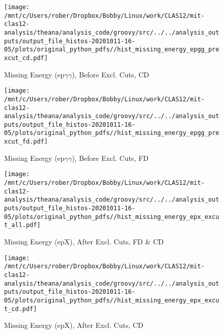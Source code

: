 \documentclass{article}
\begin{document}
\begin{landscape}
    \begin{figure}[h]
        \centering

        \texttt{[image: /mnt/c/Users/rober/Dropbox/Bobby/Linux/work/CLAS12/mit-clas12-analysis/theana/analysis\_code/groovy/src/../../analysis\_outputs/output\_file\_histos-20201011-16-05/plots/original\_python\_pdfs//hist\_missing\_energy\_epgg\_prexcut\_cd.pdf]}
        \captionsetup{textformat=empty,labelformat=blank}
        \caption{Missing Energy (ep$\gamma$$\gamma$), Before Excl. Cuts, CD}
    \end{figure}
    \clearpage
    
    \begin{figure}[h]
        \centering

        \texttt{[image: /mnt/c/Users/rober/Dropbox/Bobby/Linux/work/CLAS12/mit-clas12-analysis/theana/analysis\_code/groovy/src/../../analysis\_outputs/output\_file\_histos-20201011-16-05/plots/original\_python\_pdfs//hist\_missing\_energy\_epgg\_prexcut\_fd.pdf]}
        \captionsetup{textformat=empty,labelformat=blank}
        \caption{Missing Energy (ep$\gamma$$\gamma$), Before Excl. Cuts, FD}
    \end{figure}
    \clearpage
    
    \begin{figure}[h]
        \centering

        \texttt{[image: /mnt/c/Users/rober/Dropbox/Bobby/Linux/work/CLAS12/mit-clas12-analysis/theana/analysis\_code/groovy/src/../../analysis\_outputs/output\_file\_histos-20201011-16-05/plots/original\_python\_pdfs//hist\_missing\_energy\_epx\_excut\_all.pdf]}
        \captionsetup{textformat=empty,labelformat=blank}
        \caption{Missing Energy (epX), After Excl. Cuts, FD \& CD}
    \end{figure}
    \clearpage
    
    \begin{figure}[h]
        \centering

        \texttt{[image: /mnt/c/Users/rober/Dropbox/Bobby/Linux/work/CLAS12/mit-clas12-analysis/theana/analysis\_code/groovy/src/../../analysis\_outputs/output\_file\_histos-20201011-16-05/plots/original\_python\_pdfs//hist\_missing\_energy\_epx\_excut\_cd.pdf]}
        \captionsetup{textformat=empty,labelformat=blank}
        \caption{Missing Energy (epX), After Excl. Cuts, CD}
    \end{figure}
    \clearpage
    
    \begin{figure}[h]
        \centering


\end{figure}
\end{landscape}
\end{document}
